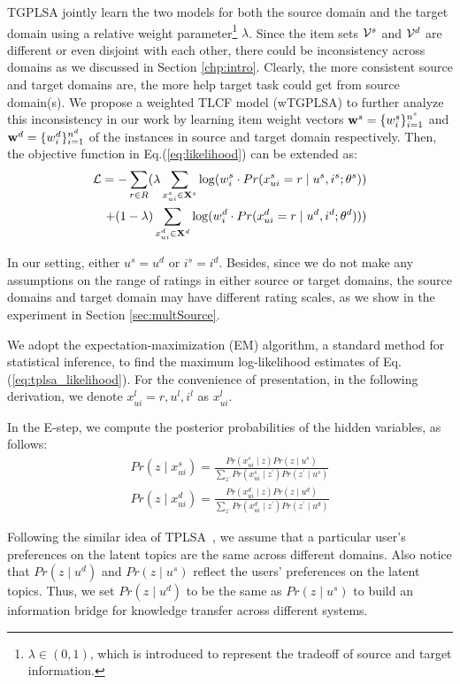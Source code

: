 TGPLSA jointly learn the two models for both the source domain and the target domain using a relative weight parameter\footnote{$\lambda \in (0,1)$, which is introduced to represent the tradeoff of source and target information.} $\lambda$. Since the item sets $\mathcal{V}^s$ and $\mathcal{V}^d$ are different or even disjoint with each other, there could be inconsistency across domains as we discussed in Section \ref{chp:intro}. Clearly, the more consistent source and target domains are, the more help target task could get from source domain(s). We propose a weighted TLCF model (wTGPLSA) to further analyze this inconsistency in our work by learning item weight vectors $\mathbf{w}^{s} = \{w_i^s\}_{i=1}^{n^s}$ and $\mathbf{w}^{d} = \{w_i^d\}_{i=1}^{n^d}$ of the instances in source and target domain respectively. Then, the objective function in Eq.(\ref{eq:likelihood}) can be extended as:
\begin{eqnarray}\label{eq:tplsa_likelihood}
\mathcal{L} = - \sum_{r \in R} ( \lambda \sum_{x_{ui}^s \in \mathbf{X}^s} \log ( w_i^s \cdot Pr(x_{ui}^s = r \mid u^s,i^s ; \theta^s) )  \\\nonumber
+ (1-\lambda) \sum_{x_{ui}^d \in \mathbf{X}^d} \log ( w_i^d  \cdot Pr(x_{ui}^d = r \mid u^d,i^d ; \theta^{d}) ) )
\end{eqnarray}

In our setting, either $u^s = u^d$ or $i^s = i^d$. Besides, since we do not make any assumptions on the range of ratings in either source or target domains, the source domains and target domain may have different rating scales, as we show in the experiment in Section \ref{sec:multSource}.

We adopt the expectation-maximization (EM) algorithm, a standard method for statistical inference, to find the maximum log-likelihood estimates of Eq. (\ref{eq:tplsa_likelihood}).
For the convenience of presentation, in the following derivation, we denote $x_{ui}^l\!=\!r, u^l, i^l$ as $x_{ui}^l$.

In the E-step, we compute the posterior probabilities of the hidden variables, as follows:
\begin{eqnarray}\label{eq:p_z_r}
\nonumber
Pr(z \mid x_{ui}^s) \!=\! \frac{Pr(x_{ui}^s \mid z) Pr(z \mid u^s)}{\sum_{z^{'}} Pr(x_{ui}^s \mid z^{'}) Pr(z^{'} \mid u^s)}\\
Pr(z \mid x_{ui}^d) \!=\! \frac{Pr(x_{ui}^d \mid z) Pr(z \mid u^d)}{\sum_{z^{'}} Pr(x_{ui}^d \mid z^{'}) Pr(z^{'} \mid u^d)}
\end{eqnarray}

Following the similar idea of TPLSA~\cite{DBLP:conf/sigir/XueDYY08}, we assume that a particular user's preferences on the latent topics are the same across different domains. Also notice that $Pr(z \mid u^d)$ and $Pr(z \mid u^s)$ reflect the users' preferences on the latent topics. Thus, we set $Pr(z \mid u^d)$ to be the same as $Pr(z \mid u^s)$ to build an information bridge for knowledge transfer across different systems.

